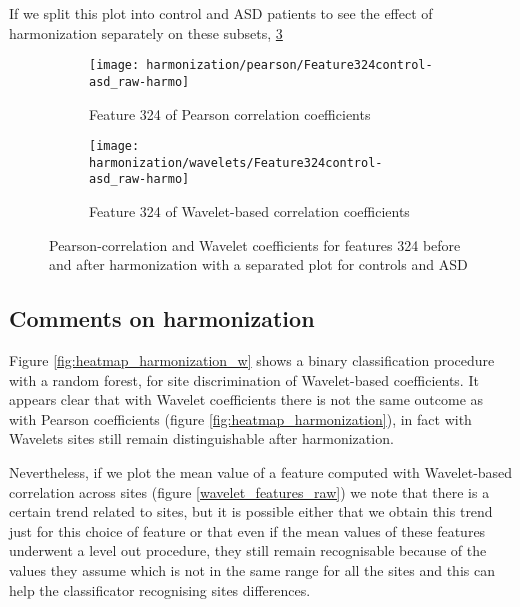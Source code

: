 \documentclass[11pt]{report}
\begin{document}
 If we split this plot into control and ASD patients to see the effect of harmonization separately on these subsets, \ref{fig:features_control-asd_raw-harmo}

 \begin{figure}
 \centering
 \begin{subfigure}[b]{1.\textwidth}
    \texttt{[image: harmonization/pearson/Feature324control-asd\_raw-harmo]}
    \caption{Feature 324 of Pearson correlation coefficients}
    \label{fig:feature324-control-asd}
 \end{subfigure}
 \begin{subfigure}[b]{1.\textwidth}
    \texttt{[image: harmonization/wavelets/Feature324control-asd\_raw-harmo]}
    \caption{Feature 324 of Wavelet-based correlation coefficients}
    \label{fig:feature324-control-asd_w}
 \end{subfigure}
 \caption{Pearson-correlation and Wavelet coefficients for features 324 before and after harmonization with a separated plot for controls and ASD}
 \label{fig:features_control-asd_raw-harmo}
 \end{figure}




\subsection{Comments on harmonization}

Figure \ref{fig:heatmap_harmonization_w} shows a binary classification procedure with a random forest, for site discrimination of Wavelet-based coefficients. It appears clear that with Wavelet coefficients there is not the same outcome as with Pearson coefficients (figure \ref{fig:heatmap_harmonization}), in fact with Wavelets sites still remain distinguishable after harmonization.

Nevertheless, if we plot the mean value of a feature computed with Wavelet-based correlation across sites (figure \ref{wavelet_features_raw}) we note that there is a certain trend related to sites, but it is possible either that we obtain this trend just for this choice of feature or that even if the mean values of these features underwent a level out procedure, they still remain recognisable because of the values they assume which is not in the same range for all the sites and this can help the classificator recognising sites differences.
\end{document}

